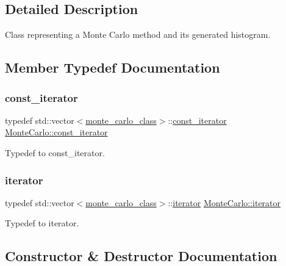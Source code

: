 \subsection{Detailed Description}
Class representing a Monte Carlo method and its generated histogram. 

\subsection{Member Typedef Documentation}
\mbox{\label{classMonteCarlo_a74dc0884e3b02002956de4fb84a0bb01}} 
\subsubsection{\texorpdfstring{const\+\_\+iterator}{const\_iterator}}
{\footnotesize\ttfamily typedef std\+::vector$<$\hyperlink{structMonteCarlo_1_1monte__carlo__class}{monte\+\_\+carlo\+\_\+class}$>$\+::\hyperlink{classMonteCarlo_a74dc0884e3b02002956de4fb84a0bb01}{const\+\_\+iterator} \hyperlink{classMonteCarlo_a74dc0884e3b02002956de4fb84a0bb01}{Monte\+Carlo\+::const\+\_\+iterator}}

Typedef to const\+\_\+iterator. \mbox{\label{classMonteCarlo_a8f83ff48a51d2f19e5c87b8fade7bbe3}} 
\subsubsection{\texorpdfstring{iterator}{iterator}}
{\footnotesize\ttfamily typedef std\+::vector$<$\hyperlink{structMonteCarlo_1_1monte__carlo__class}{monte\+\_\+carlo\+\_\+class}$>$\+::\hyperlink{classMonteCarlo_a8f83ff48a51d2f19e5c87b8fade7bbe3}{iterator} \hyperlink{classMonteCarlo_a8f83ff48a51d2f19e5c87b8fade7bbe3}{Monte\+Carlo\+::iterator}}

Typedef to iterator. 

\subsection{Constructor \& Destructor Documentation}
\mbox{\label{classMonteCarlo_a7b779a6815e26603f4c18e56195bd050}} 
